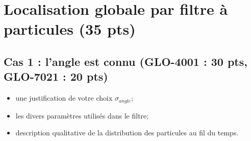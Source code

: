 \documentclass[12pt]{article}
\begin{document}
\section {Localisation globale par filtre à particules (35 pts)}

\subsection{Cas 1 : l'angle est connu (GLO-4001 : 30 pts, GLO-7021 : 20 pts)}

\begin{itemize}
\item une justification de votre choix $\sigma_{angle}$;
\item les divers paramètres utilisés dans le filtre;
\item description qualitative de la distribution des particules au fil du temps.
\end{itemize}
\end{document}
